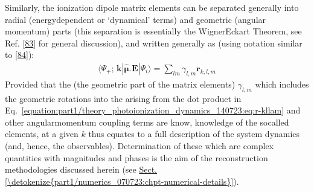 \documentclass[letterpaper,table,10pt,english]{jupyterBook}
\begin{document}
\sphinxAtStartPar
Similarly, the ionization dipole matrix elements can be separated
generally into radial (energy\sphinxhyphen{}dependent or ‘dynamical’ terms) and
geometric (angular momentum) parts (this separation is essentially the
Wigner\sphinxhyphen{}Eckart Theorem, see Ref. {[}\hyperlink{cite.backmatter/bibliography:id986}{83}{]} for general discussion),
and written generally as (using notation similar to {[}\hyperlink{cite.backmatter/bibliography:id834}{84}{]}):
\begin{equation}\label{equation:part1/theory_photoionization_dynamics_140723:eq:r-kllam}
\begin{split}\langle\Psi_{+};\,\mathbf{k}|\hat{\boldsymbol{\mu}}.\boldsymbol{\mathbf{E}}|\Psi_{i}\rangle = \sum_{lm}\gamma_{l,m}\mathbf{r}_{k,l,m}
\end{split}
\end{equation}
\sphinxAtStartPar
Provided that the {\hyperref[\detokenize{backmatter/glossary:term-geometric-coupling-parameters}]{}} (the geometric part of the matrix elements) \(\gamma_{l,m}\) \sphinxhyphen{}
which includes the geometric rotations into the {\hyperref[\detokenize{backmatter/glossary:term-LF}]{}} arising from the dot
product in Eq. \eqref{equation:part1/theory_photoionization_dynamics_140723:eq:r-kllam} and other angular\sphinxhyphen{}momentum coupling terms \sphinxhyphen{} are
know, knowledge of the so\sphinxhyphen{}called {\hyperref[\detokenize{backmatter/glossary:term-radial-matrix-elements}]{}}
elements, at a given \(k\) thus equates to a full description of the
system dynamics (and, hence, the observables). Determination of these {\hyperref[\detokenize{backmatter/glossary:term-radial-matrix-elements}]{}} \sphinxhyphen{} which are complex quantities with magnitudes and phases \sphinxhyphen{} is the aim of the reconstruction methodologies discussed herein (see \hyperref[\detokenize{part1/numerics_070723:chpt-numerical-details}]{Sect.\@ \ref{\detokenize{part1/numerics_070723:chpt-numerical-details}}}).
\end{document}
